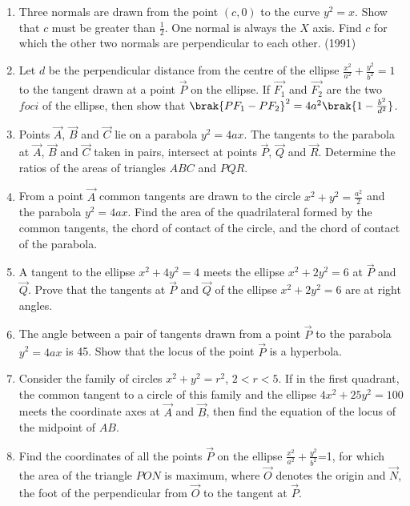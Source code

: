 \begin{enumerate}
	\item Three normals are drawn from the point $(c,0)$ to the curve $y^2=x$. Show that $c$ must be greater than $\frac{1}{2}$. One normal is always the $X$ axis. Find $c$ for which the other two normals are perpendicular to each other. 
	      \hfill(1991)
\item Let $d$ be the perpendicular distance from the centre of the ellipse $\frac{x^2}{a^2}+\frac{y^2}{b^2}=1$ to the tangent drawn at a point $\vec{P}$ on the ellipse. If $\vec{F_1}$ and $\vec{F_2}$ are the two $foci$ of the ellipse, then show that $\brak{PF_1-PF_2}^2=4a^2\brak{1-\frac{b^2}{d^2}}$. \hfill{}

\item Points $\vec{A}$, $\vec{B}$ and $\vec{C}$ lie on a parabola $y^2=4ax$. The tangents to the parabola at $\vec{A}$, $\vec{B}$ and $\vec{C}$ taken in pairs, intersect at points $\vec{P}$, $\vec{Q}$ and $\vec{R}$. Determine the ratios of the areas of triangles $ABC$ and $PQR$. \hfill{}

\item From a point $\vec{A}$ common tangents are drawn to the circle $x^2+y^2=\frac{a^2}{2}$ and the parabola $y^2=4ax$. Find the area of the quadrilateral formed by the common tangents, the chord of contact of the circle, and the chord of contact of the parabola. \hfill{}

\item A tangent to the ellipse $x^2+4y^2=4$ meets the ellipse $x^2+2y^2=6$ at $\vec{P}$ and $\vec{Q}$. Prove that the tangents at $\vec{P}$ and $\vec{Q}$ of the ellipse $x^2+2y^2=6$ are at right angles. \hfill{}

\item The angle between a pair of tangents drawn from a point $\vec{P}$ to the parabola $y^2=4ax$ is 45\degree. Show that the locus of the point $\vec{P}$ is a hyperbola. \hfill{}

\item Consider the family of circles $x^2+y^2=r^2$, $2<r<5$. If in the first quadrant, the common tangent to a circle of this family and the ellipse $4x^2+25y^2=100$ meets the coordinate axes at $\vec{A}$ and $\vec{B}$, then find the equation of the locus of the midpoint of $AB$. \hfill{}

\item Find the coordinates of all the points $\vec{P}$ on the ellipse $\frac{x^2}{a^2}+\frac{y^2}{b^2}$=1, for which the area of the triangle $PON$ is maximum, where $\vec{O}$ denotes the origin and $\vec{N}$, the foot of the perpendicular from $\vec{O}$ to the tangent at $\vec{P}$. \hfill{}


\end{enumerate}
